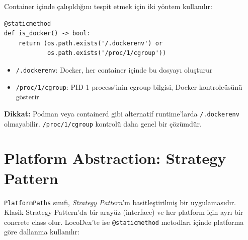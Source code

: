 Container i\c{c}inde \c{c}al{\i}\c{s}{\i}ld{\i}\u{g}{\i}n{\i} tespit etmek i\c{c}in iki y\"{o}ntem kullan{\i}l{\i}r:

\begin{verbatim}
@staticmethod
def is_docker() -> bool:
    return (os.path.exists('/.dockerenv') or
            os.path.exists('/proc/1/cgroup'))
\end{verbatim}

\begin{itemize}
  \item \texttt{/.dockerenv}: Docker, her container i\c{c}inde bu dosyay{\i} olu\c{s}turur
  \item \texttt{/proc/1/cgroup}: PID 1 process'inin cgroup bilgisi, Docker kontrolc\"{u}s\"{u}n\"{u} g\"{o}sterir
\end{itemize}

\textbf{Dikkat:} Podman veya containerd gibi alternatif runtime'larda \texttt{/.dockerenv} olmayabilir. \texttt{/proc/1/cgroup} kontrol\"{u} daha genel bir \c{c}\"{o}z\"{u}md\"{u}r.

\section{Platform Abstraction: Strategy Pattern}
\label{sec:strategy-pattern}

\texttt{PlatformPaths} s{\i}n{\i}f{\i}, \emph{Strategy Pattern}'{\i}n basitle\c{s}tirilmi\c{s} bir uygulamas{\i}d{\i}r. Klasik Strategy Pattern'da bir aray\"{u}z (interface) ve her platform i\c{c}in ayr{\i} bir concrete class olur. LocoDex'te ise \texttt{@staticmethod} metodlar{\i} i\c{c}inde platforma g\"{o}re dallanma kullan{\i}l{\i}r:

